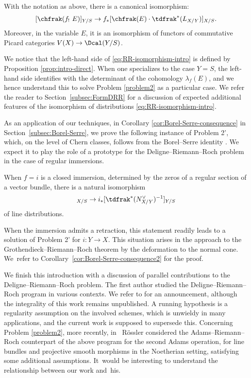 \begin{problem2prime}

With the notation as above, there is a canonical isomorphism:
\begin{equation}\label{eq:RR-isomorphism-intro}
[\chfrak(f_!\ E)]_{Y/S}\to f_\ast [\chfrak(E) \cdot \tdfrak^{\ast}(L_{X/Y})]_{X/S}.
\end{equation}
Moreover, in the variable $E$, it is an isomorphism of functors of commutative Picard categories $V(X)\to\Dcal(Y/S)$.
\end{problem2prime}

We notice that the left-hand side of \eqref{eq:RR-isomorphism-intro} is defined by Proposition \ref{prop:intro-direct}. When one specializes to the case $Y=S$, the left-hand side identifies with the determinant of the cohomology $\lambda_{f}(E)$, and we hence understand this to solve Problem \ref{problem2} as a particular case. We refer the reader to Section~\ref{subsec:FormDRR} for a discussion of expected additional features of the isomorphism of distributions \eqref{eq:RR-isomorphism-intro}.

As an application of our techniques, in Corollary \ref{cor:Borel-Serre-consequence} in Section~\ref{subsec:Borel-Serre}, we prove the following instance of Problem 2', which, on the level of Chern classes, follows from the Borel--Serre identity \cite[Lem.\,18]{Borel-Serre}. We expect it to play the role of a prototype for the Deligne--Riemann--Roch problem in the case of regular immersions.

\begin{thm}
When $f=i$ is a closed immersion, determined by the zeros of a regular section of a vector bundle, there is a natural isomorphism
\begin{displaymath}
[\chfrak(i_! \ \Ocal_Y)]_{X/S} \to i_\ast [\tdfrak^{\ast}(N_{X/Y}^\vee)^{-1}]_{Y/S}
\end{displaymath}
of line distributions.
\end{thm}
When the immersion admits a retraction, this statement readily leads to a solution of Problem 2' for $i\colon Y\to X$. This situation arises in the approach to the Grothendieck--Riemann--Roch theorem by the deformation to the normal cone. We~refer to Corollary~\ref{cor:Borel-Serre-consequence2} for the proof.

We finish this introduction with a discussion of parallel contributions to the Deligne--Riemann--Roch problem.
The first author studied the Deligne--Riemann--Roch program in various contexts. We refer to \cite{EriComptes} for an announcement, although the integrality of this work remains unpublished. A running hypothesis is a regularity assumption on the involved schemes, which is unwieldy in many applications, and the current work is supposed to supersede this. Concerning Problem \ref{problem2}, more recently, in~\cite{Rossler-ARR} Rössler considered the Adams--Riemann--Roch counterpart of the above program for the second Adams operation, for line bundles and projective smooth morphisms in the Noetherian setting, satisfying some additional assumptions. It~would be interesting to understand the relationship between our work and~his.

